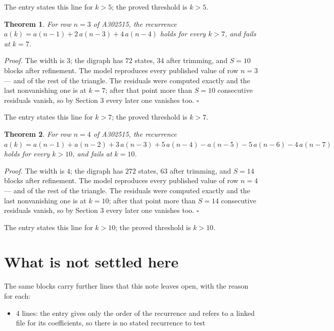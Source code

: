 \documentclass[11pt]{article}
\newtheorem{theorem}{Theorem}
\theoremstyle{definition}
\begin{document}
The entry states this line for $k > 5$; the proved threshold is $k > 5$.

\begin{theorem} For row $n = 3$ of A302515, the recurrence $a(k) = a(n-1) + 2\,a(n-3) + 4\,a(n-4)$ holds for every $k > 7$, and fails at $k = 7$.\end{theorem}

{\itshape Proof.} The width is $3$; the digraph has $72$ states, $34$ after trimming, and $S = 10$ blocks after refinement. The model reproduces every published value of row $n = 3$ --- and of the rest of the triangle. The residuals were computed exactly and the last nonvanishing one is at $k = 7$; after that point more than $S = 10$ consecutive residuals vanish, so by Section 3 every later one vanishes too. $\square$

The entry states this line for $k > 7$; the proved threshold is $k > 7$.

\begin{theorem} For row $n = 4$ of A302515, the recurrence $a(k) = a(n-1) + a(n-2) + 3\,a(n-3) + 5\,a(n-4) - a(n-5) - 5\,a(n-6) - 4\,a(n-7)$ holds for every $k > 10$, and fails at $k = 10$.\end{theorem}

{\itshape Proof.} The width is $4$; the digraph has $272$ states, $63$ after trimming, and $S = 14$ blocks after refinement. The model reproduces every published value of row $n = 4$ --- and of the rest of the triangle. The residuals were computed exactly and the last nonvanishing one is at $k = 10$; after that point more than $S = 14$ consecutive residuals vanish, so by Section 3 every later one vanishes too. $\square$

The entry states this line for $k > 10$; the proved threshold is $k > 10$.

\section{What is not settled here}

The same blocks carry further lines that this note leaves open, with the reason for each:

\begin{itemize}

\item 4 lines: the entry gives only the order of the recurrence and refers to a linked file for its coefficients, so there is no stated recurrence to test

\end{itemize}
\end{document}
